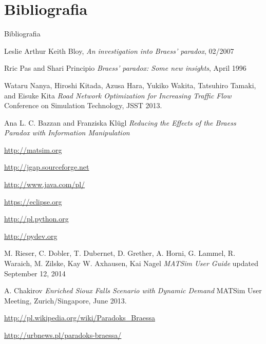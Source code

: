 \documentclass{beamer}
\begin{document}
\section{Bibliografia}
\begin{frame}[allowframebreaks]{Bibliografia}
\begin{thebibliography}{10}

	Leslie Arthur Keith Bloy, 
	\newblock \textit{An investigation into Braess’ paradox}, 02/2007

	Rric Pas and Shari Principio
	\newblock \textit{Braess’ paradox: Some new insights}, April 1996

	Wataru Nanya, Hiroshi Kitada, Azusa Hara, Yukiko Wakita, Tatsuhiro Tamaki, and Eisuke Kita
	\newblock \textit{Road Network Optimization for Increasing Traffic Flow}
	\newblock Conference on Simulation Technology, JSST 2013.

	Ana L. C. Bazzan and Franziska Klügl
	\newblock \textit{Reducing the Effects of the Braess Paradox with Information Manipulation}


\framebreak

	\url{http://matsim.org}	

	\url{http://jgap.sourceforge.net}

	\url{http://www.java.com/pl/}

	\url{https://eclipse.org}
				
	\url{http://pl.python.org}
	
	\url{http://pydev.org}

\framebreak

	M. Rieser, C. Dobler, T. Dubernet, D. Grether, A. Horni, G. Lammel, R. Waraich, M. Zilske, Kay W. Axhausen, Kai Nagel
	\newblock \textit{MATSim User Guide}
	\newblock updated September 12, 2014

	A. Chakirov
	\newblock \textit{Enriched Sioux Falls Scenario with Dynamic Demand}
	\newblock MATSim User Meeting, Zurich/Singapore, June 2013.
	
	\url{http://pl.wikipedia.org/wiki/Paradoks_Braessa}
	
	\url{http://urbnews.pl/paradoks-braessa/}
		
\end{thebibliography}
\end{frame}
\end{document}
